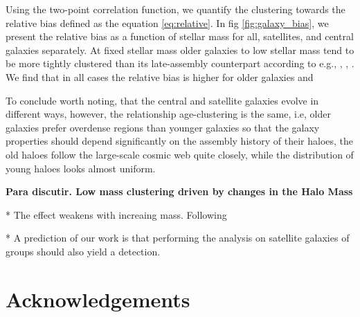 \documentclass[fleqn,usenatbib]{mnras}
\begin{document}
Using the two-point correlation function, we quantify the clustering
towards the relative bias defined as the equation
\ref{eq:relative}. In fig \ref{fig:galaxy_bias}, we present the
relative bias as a function of stellar mass for all, satellites, and
central galaxies separately. At fixed stellar mass older galaxies to
low stellar mass tend to be more tightly clustered than its
late-assembly counterpart according to e.g., \citep{Lacerna_2014},
\citep{2013MNRAS.433..515W}, \citep{2009MNRAS.394.2229Z}. We find that
in all cases the relative bias is higher for older galaxies and 


To conclude worth noting, that the central and satellite galaxies
evolve in different ways, however, the relationship age-clustering is
the same, i.e, older galaxies prefer overdense regions than younger
galaxies so that the galaxy properties should depend significantly on
the assembly history of their haloes, the old haloes follow the
large-scale cosmic web quite closely, while the distribution of young
haloes looks almost uniform. 


\textbf{Para discutir. Low mass clustering driven by changes in the Halo Mass}

* The effect weakens with increaing mass. Following 

* A prediction of our work is that performing the analysis on
satellite galaxies of groups should also yield a detection.

\section*{Acknowledgements}








\bsp	%
\label{lastpage}
\end{document}

